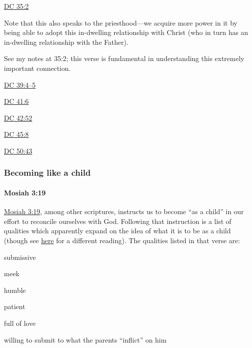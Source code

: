 \begin{compactitem}
\begin{compactitem}
				\end{compactitem}
			\item \hyperref[DC35-2]{DC 35:2} \phantom{.}
				\begin{compactitem}
					\item Note that this also speaks to the priesthood---we acquire more power in it by being able to adopt this in-dwelling relationship with Christ (who in turn has an in-dwelling relationship with the Father).
					\item See my notes at 35:2; this verse is fundamental in understanding this extremely important connection.
				\end{compactitem}
			\item \hyperref[DC39-4]{DC 39:4--5}
			\item \hyperref[DC41-6]{DC 41:6}
			\item \hyperref[DC42-52]{DC 42:52}
			\item \hyperref[DC45-8]{DC 45:8}
			\item \hyperref[DC50-43]{DC 50:43}
		\end{compactitem}
		
	\subsubsection{Becoming like a child}
		\label{NEWBIRTH-child}
		
		\paragraph{Mosiah 3:19}
		
			\hyperref[MOSIAH-3-19]{Mosiah 3:19}, among other scriptures, instructs us to become ``as a child'' in our effort to reconcile ourselves with God. Following that instruction is a list of qualities which apparently expand on the idea of what it is to be as a child (though see \hyperref[MOSIAH-3-19-NOTE-child]{here} for a different reading). The qualities listed in that verse are:
			
				\begin{compactitem}
					\item submissive
					\item meek
					\item humble
					\item patient
					\item full of love
					\item willing to submit to what the parents ``inflict'' on him
				\end{compactitem}
				
